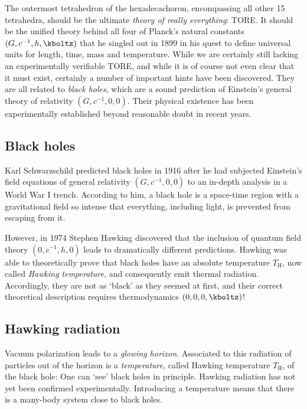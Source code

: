 

\newpage {}
\label{sec:1111}

The outermost tetrahedron of the hexadecachoron, encompassing all other 15 tetrahedra, should be the ultimate \emph{theory of really everything}: TORE. It should be the unified theory behind all four of Planck's natural constants $(G,c^{-1},h,\kboltz)$ that he singled out in 1899 in his quest to define universal units for length, time, mass and temperature. While we are certainly still lacking an experimentally verifiable TORE, and while it is of course not even clear that it must exist, certainly a number of important hints have been discovered. They are all related to \emph{black holes}, which are a sound prediction of Einstein's general theory of relativity $(G,c^{-1},0,0)$. Their physical existence has been experimentally established beyond reasonable doubt in recent years.


\subsection*{Black holes}

Karl Schwarzschild predicted black holes in 1916 after he had subjected Einstein's field equations of general relativity $(G,c^{-1},0,0)$ to an in-depth analysis in a  World War I trench. According to him, a black hole is a space-time region with a gravitational field so intense that everything, including light, is prevented from escaping from it.

However, in 1974 Stephen Hawking discovered that the inclusion of quantum field theory $(0,c^{-1},h,0)$ leads to dramatically different predictions. Hawking was able to theoretically prove that black holes have an absolute temperature $T_\mathrm{H}$, now called \emph{Hawking temperature}, and consequently emit thermal radiation. Accordingly, they are not as \enquote*{black} as they seemed at first, and their correct theoretical description requires thermodynamics $(0,0,0,\kboltz)$!


\subsection*{Hawking radiation}

Vacuum polarization leads to a \emph{glowing horizon}. Associated to this radiation of particles out of the horizon is a \emph{temperature}, called Hawking temperature $T_{\text{H}}$, of the black hole: One can \enquote*{see} black holes in principle. Hawking radiation has not yet been confirmed experimentally. Introducing a temperature means that there is a many-body system close to black holes. 


